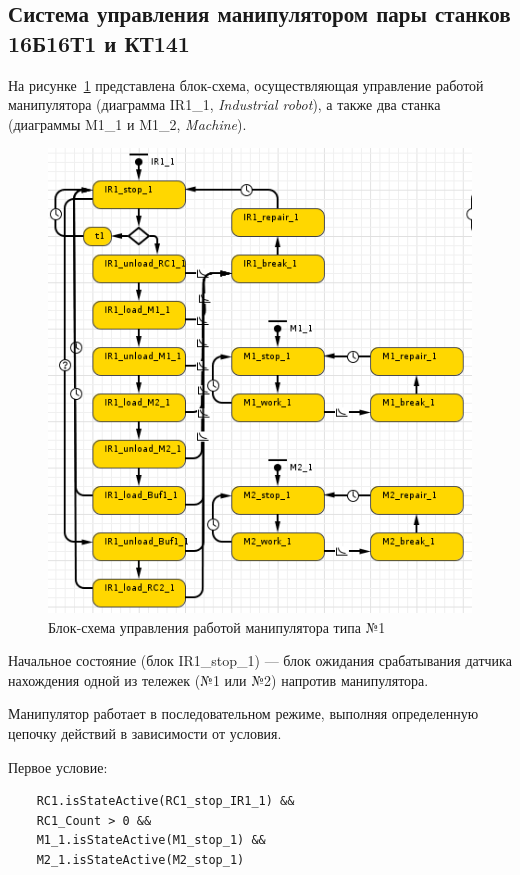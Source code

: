 \subsection{Система управления манипулятором пары станков 16Б16Т1 и КТ141}

На рисунке~\ref{fig:ir1_1} представлена блок-схема, осуществляющая управление работой манипулятора (диаграмма IR1\_1, \textit{Industrial robot}), а также два станка (диаграммы M1\_1 и M1\_2, \textit{Machine}).

\begin{figure}[ht]
    \includegraphics[width=1\linewidth]{Figures/ir1_1.png}
    \caption{Блок-схема управления работой манипулятора типа №1}
    \label{fig:ir1_1}
\end{figure}

Начальное состояние (блок IR1\_stop\_1) --- блок ожидания срабатывания датчика нахождения одной из тележек (№1 или №2) напротив манипулятора.

Манипулятор работает в последовательном режиме, выполняя определенную цепочку действий в зависимости от условия.

Первое условие:

\begin{verbatim}
    RC1.isStateActive(RC1_stop_IR1_1) &&
    RC1_Count > 0 &&
    M1_1.isStateActive(M1_stop_1) &&
    M2_1.isStateActive(M2_stop_1)
\end{verbatim}


